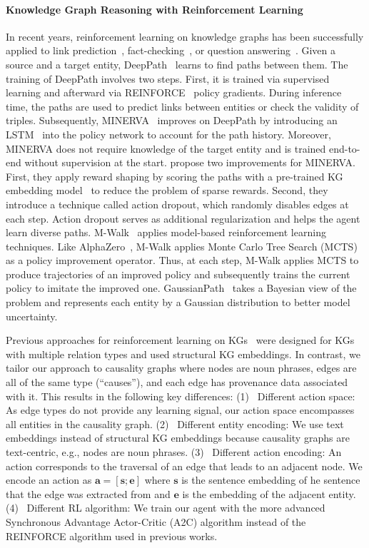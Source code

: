 \paragraph{Knowledge Graph Reasoning with Reinforcement Learning}
In recent years, reinforcement learning on knowledge graphs has been successfully applied to link prediction~\cite{Das2018Minerva}, fact-checking~\cite{Xiong2017DeePpath}, or question answering~\cite{Qiu2020Stepwise}. Given a source and a target entity, DeepPath~\cite{Xiong2017DeePpath} learns to find paths between them. The training of DeepPath involves two steps. First, it is trained via supervised learning and afterward via REINFORCE~\cite{Williams1992REINFORCE} policy gradients. During inference time, the paths are used to predict links between entities or check the validity of triples. Subsequently, MINERVA~\cite{Das2018Minerva} improves on DeepPath by introducing an LSTM~\cite{Hochreiter1997LSTM} into the policy network to account for the path history. Moreover, MINERVA does not require knowledge of the target entity and is trained end-to-end without supervision at the start. \citet{Lin2020RewardShaping} propose two improvements for MINERVA. First, they apply reward shaping by scoring the paths with a pre-trained KG embedding model~\cite{Dettmers2018ConvE} to reduce the problem of sparse rewards. Second, they introduce a technique called action dropout, which randomly disables edges at each step. Action dropout serves as additional regularization and helps the agent learn diverse paths. M-Walk~\cite{Shen2018MWalk} applies model-based reinforcement learning techniques. Like AlphaZero~\cite{Silver2018AlphaZero}, M-Walk applies Monte Carlo Tree Search (MCTS) as a policy improvement operator. Thus, at each step, M-Walk applies MCTS to produce trajectories of an improved policy and subsequently trains the current policy to imitate the improved one. GaussianPath~\cite{Wan2021GaussianPath} takes a Bayesian view of the problem and represents each entity by a Gaussian distribution to better model uncertainty.

Previous approaches for reinforcement learning on KGs~\cite{Xiong2017DeePpath, Das2018Minerva, Qiu2020Stepwise} were designed for KGs with multiple relation types and used structural KG embeddings. In contrast, we tailor our approach to causality graphs where nodes are noun phrases, edges are all of the same type (“causes”), and each edge has provenance data associated with it. This results in the following key differences:
(1)~
Different action space:
As edge types do not provide any learning signal, our action space encompasses all entities in the causality graph.
(2)~
Different entity encoding: 
We use text embeddings instead of structural KG embeddings because causality graphs are text-centric, e.g., nodes are noun phrases.
(3)~
Different action encoding:
An action corresponds to the traversal of an edge that leads to an adjacent node. We encode an action as $\textbf{a}=[\textbf{s};\textbf{e}]$ where $\textbf{s}$ is the sentence embedding of he sentence that the edge was extracted from and $\textbf{e}$ is the embedding of the adjacent entity.
(4)~
Different RL algorithm:
We train our agent with the more advanced Synchronous Advantage Actor-Critic (A2C) algorithm instead of the REINFORCE algorithm used in previous works.

